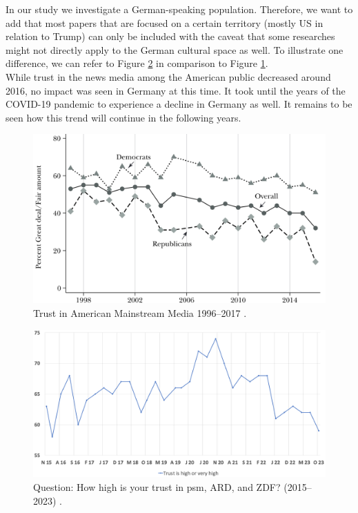 \documentclass[
  a4paper,  %
  twoside,  %
  bibliography=totoc,
  headsepline,
  cleardoublepage=empty,
  parskip=half,
  draft=false
]{scrbook}
\begin{document}
In our study we investigate a German-speaking population. Therefore, we want to add that most papers that are focused on a certain territory (mostly US in relation to Trump) can only be included with the caveat that some researches might not directly apply to the German cultural space as well. To illustrate one difference, we can refer to Figure \ref{fig:trust-ger} in comparison to Figure \ref{fig:trust-us}. \\
While trust in the news media among the American public decreased around 2016, no impact was seen in Germany at this time. It took until the years of the COVID-19 pandemic to experience a decline in Germany as well. It remains to be seen how this trend will continue in the following years.

\begin{figure}[h]
  \centering
  \centering
  \includegraphics[width=0.75\linewidth]{./graphics/trust-america mainstream.png}
  \caption{Trust in American Mainstream Media 1996–2017 \cite{allcottSocialMediaFake2017}.}
  \label{fig:trust-us}
\end{figure}
\begin{figure}[h]
  \centering
  \includegraphics[width=0.8\linewidth]{./graphics/FGW-Trust-in-ARDZDF.png}
  \caption{Question: How high is your trust in \gls{psm}, ARD, and ZDF? (2015–2023) \cite{zdf-politbarometerVertrauenGlaubwuerdigkeitBerichterstattung2023}.}
  \label{fig:trust-ger}
\end{figure}
\end{document}
